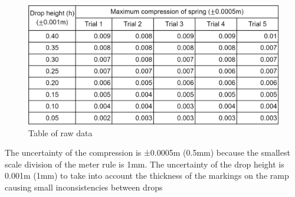 \FloatBarrier
\begin{figure}
    \includegraphics[width = \textwidth]{rawtbl.png}
    \caption{Table of raw data}
\end{figure}
\FloatBarrier
The uncertainty of the compression is ±0.0005m (0.5mm) because the smallest scale division of the meter rule is 1mm. The uncertainty of the drop height is 0.001m (1mm) to take into account the thickness of the markings on the ramp causing small inconsistencies between drops